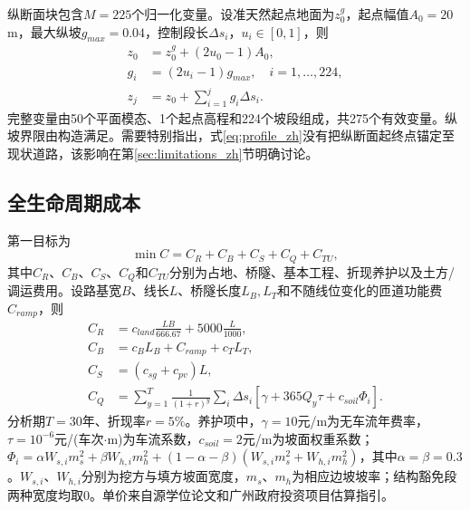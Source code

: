 \documentclass[preprint,12pt]{elsarticle}
\begin{document}
纵断面块包含$M=225$个归一化变量。设准天然起点地面为$z^g_0$，起点幅值$A_0=20$ m，最大纵坡$g_{max}=0.04$，控制段长$\Delta s_i$，$u_i\in[0,1]$，则
\begin{align}
z_0&=z^g_0+(2u_0-1)A_0,\\
g_i&=(2u_i-1)g_{max},\quad i=1,\ldots,224,\\
z_j&=z_0+\sum_{i=1}^{j}g_i\Delta s_i.
\label{eq:profile_zh}
\end{align}
完整变量由50个平面模态、1个起点高程和224个坡段组成，共275个有效变量。纵坡界限由构造满足。需要特别指出，式\eqref{eq:profile_zh}没有把纵断面起终点锚定至现状道路，该影响在第\ref{sec:limitations_zh}节明确讨论。

\subsection{全生命周期成本}

第一目标为
\begin{equation}
\min C=C_R+C_B+C_S+C_Q+C_{TU},
\label{eq:lcc_zh}
\end{equation}
其中$C_R$、$C_B$、$C_S$、$C_Q$和$C_{TU}$分别为占地、桥隧、基本工程、折现养护以及土方/调运费用。设路基宽$B$、线长$L$、桥隧长度$L_B,L_T$和不随线位变化的匝道功能费$C_{ramp}$，则
\begin{align}
C_R&=c_{land}\frac{LB}{666.67}+5000\frac{L}{1000},\\
C_B&=c_BL_B+C_{ramp}+c_TL_T,\\
C_S&=(c_{sg}+c_{pv})L,\label{eq:lccparts_zh}\\
C_Q&=\sum_{y=1}^{T}\frac{1}{(1+r)^y}
\sum_i\Delta s_i[\gamma+365Q_y\tau+c_{soil}\Phi_i].
\end{align}
分析期$T=30$年、折现率$r=5\%$。养护项中，$\gamma=10$元/m为无车流年费率，$\tau=10^{-6}$元/(车次$\cdot$m)为车流系数，$c_{soil}=2$元/m为坡面权重系数；$\Phi_i=\alpha W_{s,i}m_s^2+\beta W_{h,i}m_h^2+(1-\alpha-\beta)(W_{s,i}m_s^2+W_{h,i}m_h^2)$，其中$\alpha=\beta=0.3$。$W_{s,i}$、$W_{h,i}$分别为挖方与填方坡面宽度，$m_s$、$m_h$为相应边坡坡率；结构豁免段两种宽度均取0。单价来自源学位论文和广州政府投资项目估算指引\cite{guangzhou2025}。
\end{document}
